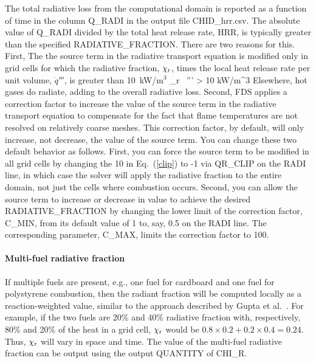 \documentclass[11pt]{book}
\begin{document}
The total radiative loss from the computational domain is reported as a function of time in the column {\ct Q\_RADI} in the output file {\ct CHID\_hrr.csv}. The absolute value of {\ct Q\_RADI} divided by the total heat release rate, {\ct HRR}, is typically greater than the specified {\ct RADIATIVE\_FRACTION}. There are two reasons for this. First, The the source term in the radiative transport equation is modified only in grid cells for which the radiative fraction, $\chi_{\rm r}$, times the local heat release rate per unit volume, $\dot{q}'''$, is greater than 10~kW/m$^3$
\be
   \chi_{\rm r} \, ''' > 10 \; \hbox{kW/m}^3 \label{clip}
\ee
Elsewhere, hot gases do radiate, adding to the overall radiative loss. Second, FDS applies a correction factor to increase the value of the source term in the radiative transport equation to compensate for the fact that flame temperatures are not resolved on relatively coarse meshes. This correction factor, by default, will only increase, not decrease, the value of the source term. You can change these two default behavior as follows. First, you can force the source term to be modified in all grid cells by changing the 10 in Eq.~(\ref{clip}) to -1 via {\ct QR\_CLIP} on the {\ct RADI} line, in which case the solver will apply the radiative fraction to the entire domain, not just the cells where combustion occurs. Second, you can allow the source term to increase or decrease in value to achieve the desired {\ct RADIATIVE\_FRACTION} by changing the lower limit of the correction factor, {\ct C\_MIN}, from its default value of 1 to, say, 0.5 on the {\ct RADI} line. The corresponding parameter, {\ct C\_MAX}, limits the correction factor to 100.

\paragraph{Multi-fuel radiative fraction}

If multiple fuels are present, e.g., one fuel for cardboard and one fuel for polystyrene combustion, then the radiant fraction will be computed locally as  a reaction-weighted value, similar to the approach described by Gupta et al.~\cite{Gupta:2015}. For example, if the two fuels are 20\% and 40\% radiative fraction with, respectively, 80\% and 20\% of the heat in a grid cell, $\chi_{\rm r}$ would be $0.8 \times 0.2 + 0.2 \times 0.4 = 0.24$. Thus, $\chi_{\rm r}$ will vary in space and time. The value of the multi-fuel radiative fraction can be output using the output {\ct QUANTITY} of {\ct CHI\_R}.
\end{document}
